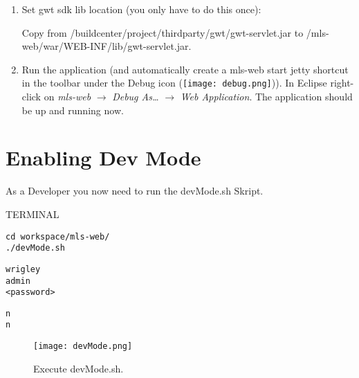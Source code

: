 \documentclass[10pt,a4paper]{article}
\begin{document}
\begin{enumerate}
\item{}Set gwt sdk lib location (you only have to do this once):

Copy from /buildcenter/project/thirdparty/gwt/gwt-servlet.jar to /mls-web/war/WEB-INF/lib/gwt-servlet.jar.

\item{}Run the application (and automatically create a mls-web start jetty shortcut in the toolbar under the Debug icon (\texttt{[image: debug.png]})). In Eclipse right-click on \textit{mls-web} $\rightarrow$ \textit{Debug As\ldots} $\rightarrow$ \textit{Web Application}. The application should be up and running now. 

\end{enumerate}

\newpage
\section{Enabling Dev Mode}
As a Developer you now need to run the devMode.sh Skript.

\begin{command}{TERMINAL}

\noindent
{}
\begin{lstlisting}
cd workspace/mls-web/
./devMode.sh
\end{lstlisting}

\noindent
{}
\begin{lstlisting}
wrigley
admin
<password>
\end{lstlisting}

\noindent
{}
\begin{lstlisting}
n
n
\end{lstlisting}

\noindent
{}

\end{command}

\begin{figure}[h!tp]
\begin{center}

\texttt{[image: devMode.png]}
%
\end{center}
%
\caption{Execute devMode.sh.}
\label{fig:devMode}
%
\end{figure}
\end{document}

